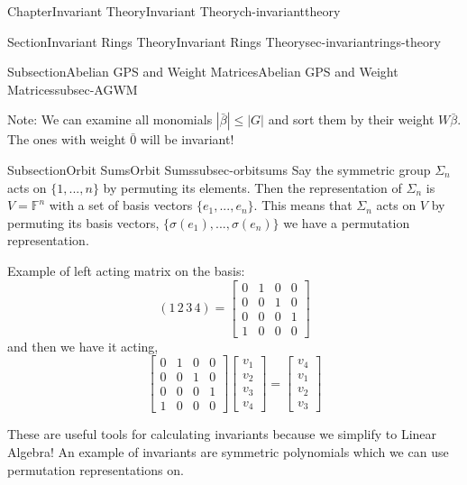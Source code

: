 \documentclass[oneside,10pt,]{book}
\newcommand{\amp}{&}
\begin{document}
\begin{chapterptx}{Chapter}{Invariant Theory}{}{Invariant Theory}{}{}{ch-invarianttheory}
\begin{sectionptx}{Section}{Invariant Rings Theory}{}{Invariant Rings Theory}{}{}{sec-invariantrings-theory}
\begin{subsectionptx}{Subsection}{Abelian GPS and Weight Matrices}{}{Abelian GPS and Weight Matrices}{}{}{subsec-AGWM}
%
\par
Note: We can examine all monomials \(|\bar \beta| \leq |G|\) and sort them by their weight \(W\bar \beta\). The ones with weight \(\bar 0\) will be invariant!%
\end{subsectionptx}
%
%
\typeout{************************************************}
\typeout{************************************************}
%
\begin{subsectionptx}{Subsection}{Orbit Sums}{}{Orbit Sums}{}{}{subsec-orbitsums}
Say the symmetric group \(\Sigma_n \) acts on \(\{1, ... , n\}\) by permuting its elements. Then the representation of \(\Sigma_n \) is \(V = \mathbb{F}^n\) with a set of basis vectors \(\{e_1, ... , e_n\}\). This means that \(\Sigma_n \) acts on \(V\) by permuting its basis vectors, \(\{\sigma(e_1),...,\sigma(e_n)\}\) we have a permutation representation.%
\par
Example of left acting matrix on the basis:%
\begin{equation*}
(1 \,2\,3\,4) =  \begin{bmatrix}
0 \amp 1 \amp 0 \amp 0 \\
0 \amp 0 \amp 1 \amp 0 \\
0 \amp 0 \amp 0 \amp 1 \\
1 \amp 0 \amp 0 \amp 0 
\end{bmatrix}   
\end{equation*}
and then we have it acting,%
\begin{equation*}
\begin{bmatrix}
0 \amp 1 \amp 0 \amp 0 \\
0 \amp 0 \amp 1 \amp 0 \\
0 \amp 0 \amp 0 \amp 1 \\
1 \amp 0 \amp 0 \amp 0 
\end{bmatrix} \begin{bmatrix}
v_1 \\
v_2 \\
v_3\\
v_4
\end{bmatrix}   =    \begin{bmatrix}
v_4 \\
v_1 \\
v_2\\
v_3
\end{bmatrix}
\end{equation*}
%
\par
These are useful tools for calculating invariants because we simplify to Linear Algebra! An example of invariants are symmetric polynomials which we can use permutation representations on.%

\end{subsectionptx}
\end{sectionptx}
\end{chapterptx}
\end{document}
